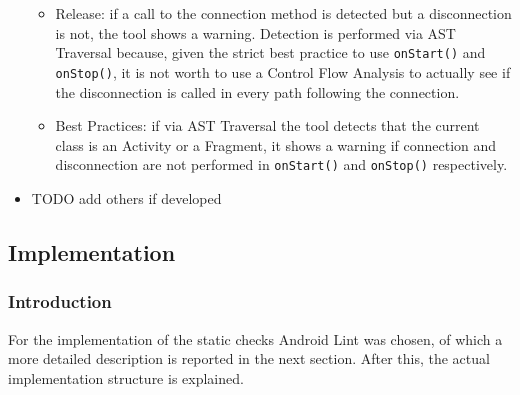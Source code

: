 \documentclass[11pt,a4paper,notitlepage]{article}
\begin{document}
\begin{itemize}
	\begin{itemize}
		\item Release: if a call to the connection method is detected but a disconnection is not, the tool shows a warning. Detection is performed via AST Traversal because, given the strict best practice to use \texttt{onStart()} and \texttt{onStop()}, it is not worth to use a Control Flow Analysis to actually see if the disconnection is called in every path following the connection.
		\item Best Practices: if via AST Traversal the tool detects that the current class is an Activity or a Fragment, it shows a warning if connection and disconnection are not performed in \texttt{onStart()} and \texttt{onStop()} respectively.
	\end{itemize}
	\item TODO add others if developed
\end{itemize}

\subsection{Implementation}

\subsubsection{Introduction}
For the implementation of the static checks Android Lint was chosen, of which a more detailed description is reported in the next section. After this, the actual implementation structure is explained.
\end{document}
